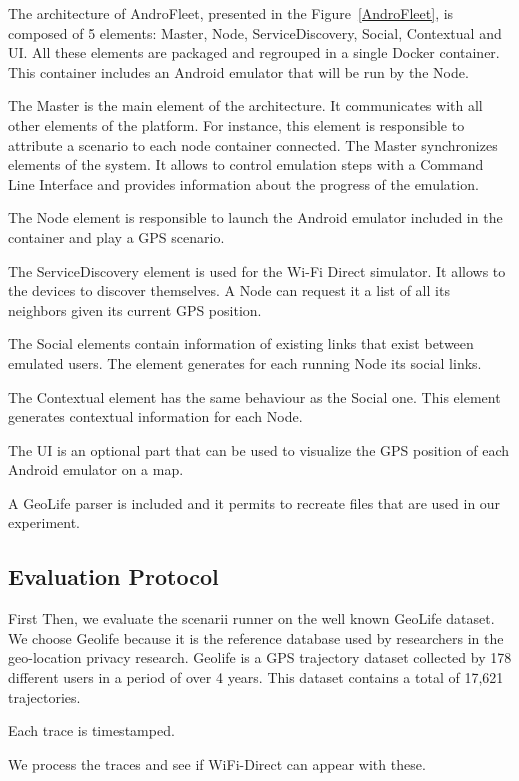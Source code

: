 The architecture of AndroFleet, presented in the Figure~\ref{AndroFleet}, is composed of 5 elements: Master, Node, ServiceDiscovery, Social, Contextual and UI.
All these elements are packaged and regrouped in a single Docker container.
This container includes an Android emulator that will be run by the Node.

The Master is the main element of the architecture.
It communicates with all other elements of the platform.
For instance, this element is responsible to attribute a scenario to each node container connected.
The Master synchronizes elements of the system.
It allows to control emulation steps with a Command Line Interface and provides information about the progress of the emulation.

The Node element is responsible to launch the Android emulator included in the container and play a GPS scenario.

The ServiceDiscovery element is used for the Wi-Fi Direct simulator.
It allows to the devices to discover themselves.
A Node can request it a list of all its neighbors given its current GPS position.

The Social elements contain information of existing links that exist between emulated users.
The element generates for each running Node its social links.

The Contextual element has the same behaviour as the Social one.
This element generates contextual information for each Node.

The UI is an optional part that can be used to visualize the GPS position of each Android emulator on a map.

A GeoLife parser is included and it permits to recreate files that are used in our experiment.

\subsection{Evaluation Protocol}


First
Then, we evaluate the scenarii runner on the well known GeoLife dataset.
We choose Geolife because it is the reference database used by researchers in the geo-location privacy research.
Geolife is a GPS trajectory dataset collected by 178 different users in a period of over 4 years. 
This dataset contains a total of 17,621 trajectories.

Each trace is timestamped.

We process the traces and see if WiFi-Direct can appear with these.

